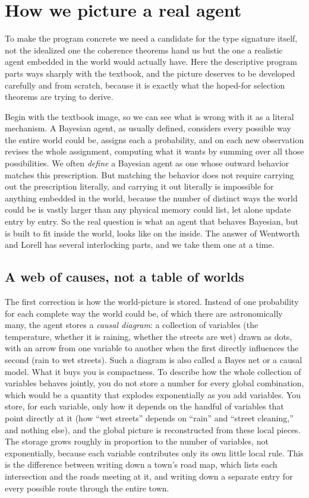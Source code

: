 \documentclass[10pt]{article}
\theoremstyle{definition}
\theoremstyle{remark}
\begin{document}
\section{How we picture a real agent}
\label{sec:picture}

To make the program concrete we need a candidate for the type signature itself, not the idealized one the coherence theorems hand us but the one a realistic agent embedded in the world would actually have. Here the descriptive program parts ways sharply with the textbook, and the picture deserves to be developed carefully and from scratch, because it is exactly what the hoped-for selection theorems are trying to derive.

Begin with the textbook image, so we can see what is wrong with it as a literal mechanism. A Bayesian agent, as usually defined, considers every possible way the entire world could be, assigns each a probability, and on each new observation revises the whole assignment, computing what it wants by summing over all those possibilities. We often \emph{define} a Bayesian agent as one whose outward behavior matches this prescription. But matching the behavior does not require carrying out the prescription literally, and carrying it out literally is impossible for anything embedded in the world, because the number of distinct ways the world could be is vastly larger than any physical memory could list, let alone update entry by entry. So the real question is what an agent that behaves Bayesian, but is built to fit inside the world, looks like on the inside. The answer of Wentworth and Lorell has several interlocking parts, and we take them one at a time.

\subsection{A web of causes, not a table of worlds}

The first correction is how the world-picture is stored. Instead of one probability for each complete way the world could be, of which there are astronomically many, the agent stores a \emph{causal diagram}: a collection of variables (the temperature, whether it is raining, whether the streets are wet) drawn as dots, with an arrow from one variable to another when the first directly influences the second (rain to wet streets). Such a diagram is also called a Bayes net or a causal model. What it buys you is compactness. To describe how the whole collection of variables behaves jointly, you do not store a number for every global combination, which would be a quantity that explodes exponentially as you add variables. You store, for each variable, only how it depends on the handful of variables that point directly at it (how ``wet streets'' depends on ``rain'' and ``street cleaning,'' and nothing else), and the global picture is reconstructed from these local pieces. The storage grows roughly in proportion to the number of variables, not exponentially, because each variable contributes only its own little local rule. This is the difference between writing down a town's road map, which lists each intersection and the roads meeting at it, and writing down a separate entry for every possible route through the entire town.
\end{document}
